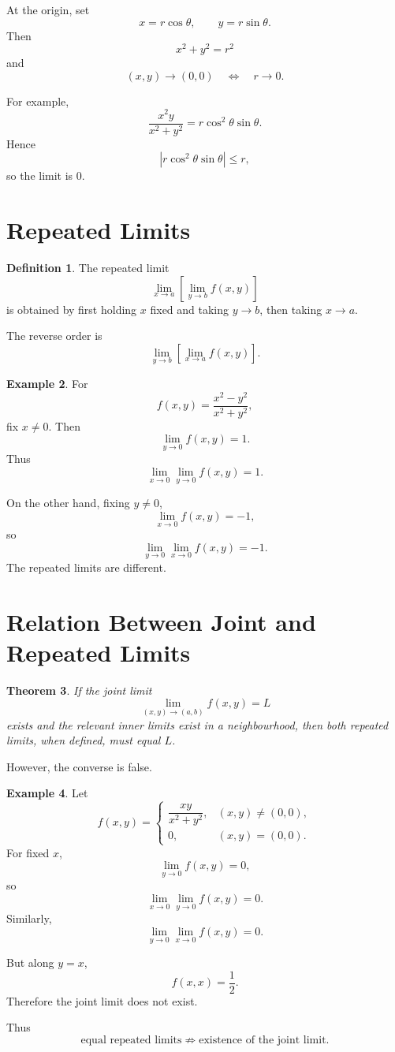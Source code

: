 \documentclass[11pt,oneside]{book}
\theoremstyle{studentthm}
\newtheorem{theorem}{Theorem}[chapter]
\theoremstyle{definition}
\newtheorem{definition}[theorem]{Definition}
\newtheorem{example}[theorem]{Example}
\newcommand{\abs}[1]{\left|#1\right|}
\begin{document}
At the origin, set
\[
x=r\cos\theta,\qquad y=r\sin\theta.
\]
Then
\[
x^2+y^2=r^2
\]
and
\[
(x,y)\to(0,0)
\quad\Longleftrightarrow\quad
r\to0.
\]

For example,
\[
\frac{x^2y}{x^2+y^2}
=
r\cos^2\theta\sin\theta.
\]
Hence
\[
\abs{r\cos^2\theta\sin\theta}\le r,
\]
so the limit is \(0\).

\section{Repeated Limits}

\begin{definition}
The repeated limit
\[
\lim_{x\to a}
\left[
\lim_{y\to b}f(x,y)
\right]
\]
is obtained by first holding \(x\) fixed and taking \(y\to b\), then
taking \(x\to a\).
\end{definition}

The reverse order is
\[
\lim_{y\to b}
\left[
\lim_{x\to a}f(x,y)
\right].
\]

\begin{example}
For
\[
f(x,y)=\frac{x^2-y^2}{x^2+y^2},
\]
fix \(x\ne0\). Then
\[
\lim_{y\to0}f(x,y)=1.
\]
Thus
\[
\lim_{x\to0}\lim_{y\to0}f(x,y)=1.
\]

On the other hand, fixing \(y\ne0\),
\[
\lim_{x\to0}f(x,y)=-1,
\]
so
\[
\lim_{y\to0}\lim_{x\to0}f(x,y)=-1.
\]
The repeated limits are different.
\end{example}

\section{Relation Between Joint and Repeated Limits}

\begin{theorem}
If the joint limit
\[
\lim_{(x,y)\to(a,b)}f(x,y)=L
\]
exists and the relevant inner limits exist in a neighbourhood, then
both repeated limits, when defined, must equal \(L\).
\end{theorem}

However, the converse is false.

\begin{example}
Let
\[
f(x,y)=
\begin{cases}
\dfrac{xy}{x^2+y^2},&(x,y)\ne(0,0),\\[1ex]
0,&(x,y)=(0,0).
\end{cases}
\]
For fixed \(x\),
\[
\lim_{y\to0}f(x,y)=0,
\]
so
\[
\lim_{x\to0}\lim_{y\to0}f(x,y)=0.
\]
Similarly,
\[
\lim_{y\to0}\lim_{x\to0}f(x,y)=0.
\]

But along \(y=x\),
\[
f(x,x)=\frac12.
\]
Therefore the joint limit does not exist.

Thus
\[
\text{equal repeated limits}
\not\Rightarrow
\text{existence of the joint limit}.
\]
\end{example}
\end{document}
